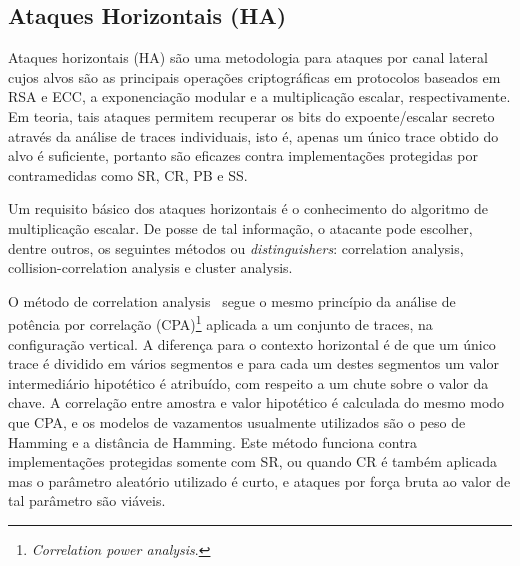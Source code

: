 

\subsection{Ataques Horizontais (HA)}

Ataques horizontais (HA) são uma metodologia para ataques por canal lateral cujos alvos são as principais operações criptográficas em protocolos baseados em RSA e ECC, a exponenciação modular e a multiplicação escalar, respectivamente. Em teoria, tais ataques permitem recuperar os bits do expoente/escalar secreto através da análise de traces individuais, isto é, apenas um único trace obtido do alvo é suficiente, portanto são eficazes contra implementações protegidas por contramedidas como SR, CR, PB e SS.

Um requisito básico dos ataques horizontais é o conhecimento do algoritmo de multiplicação escalar. De posse de tal informação, o atacante pode escolher, dentre outros, os seguintes métodos ou \textit{distinguishers}: correlation analysis, collision-correlation analysis e cluster analysis.     %

O método de correlation analysis~\cite{Clavier2010} segue o mesmo princípio da análise de potência por correlação (CPA)\footnote{\textit{Correlation power analysis}.} aplicada a um conjunto de traces, na configuração vertical. A diferença para o contexto horizontal é de que um único trace é dividido em vários segmentos e para cada um destes segmentos um valor intermediário hipotético é atribuído, com respeito a um chute sobre o valor da chave. A correlação entre amostra e valor hipotético é calculada do mesmo modo que CPA, e os modelos de vazamentos usualmente utilizados são o peso de Hamming e a distância de Hamming. Este método funciona contra implementações protegidas somente com SR, ou quando CR é também aplicada mas o parâmetro aleatório utilizado é curto, e ataques por força bruta ao valor de tal parâmetro são viáveis.

